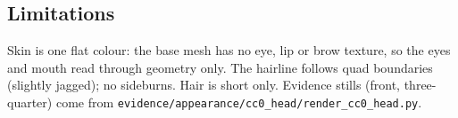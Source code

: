 \subsection{Limitations}
Skin is one flat colour: the base mesh has no eye, lip or brow texture, so the
eyes and mouth read through geometry only. The hairline follows quad
boundaries (slightly jagged); no sideburns. Hair is short only. Evidence stills
(front, three-quarter) come from
\texttt{evidence/appearance/cc0\_head/render\_cc0\_head.py}.
